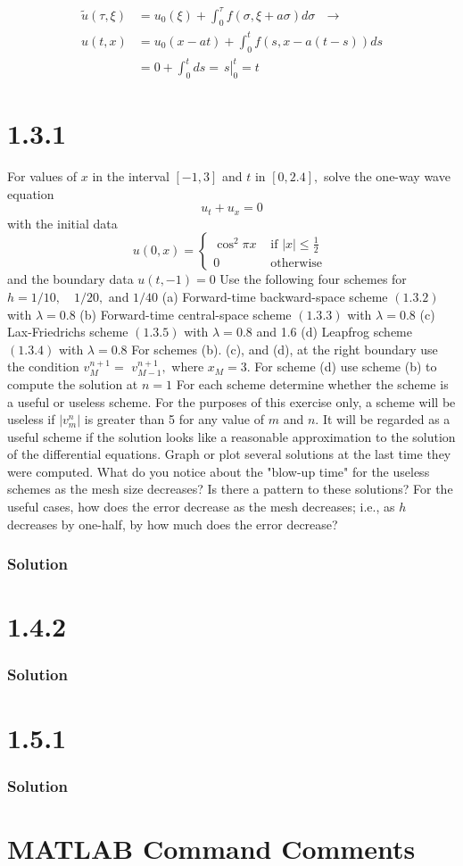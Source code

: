 \documentclass[12pt]{article}
\begin{document}
\begin{equation*}
\begin{aligned}
	\tilde{u}(\tau,\xi)& = u_0(\xi) + \int_0^\tau f(\sigma, \xi+a\sigma) d\sigma ~~~ \longrightarrow \\
	u(t,x) &= u_0(x-at) + \int_0^t f(s,x-a(t-s)) ds\\
	&= 0 + \int_0^t ds = \left.\frac{}{}s\right|_0^t = t
\end{aligned}
\end{equation*}




\section*{1.3.1}

For values of $x$ in the interval $[-1,3]$ and $t$ in $[0,2.4],$ solve the one-way wave equation
$$
u_{t}+u_{x}=0
$$
with the initial data
$$
u(0, x)=\left\{\begin{array}{ll}
{\cos ^{2} \pi x} & {\text { if }|x| \leq \frac{1}{2}} \\
{0} & {\text { otherwise }}
\end{array}\right.
$$
and the boundary data $u(t,-1)=0$
Use the following four schemes for $h=1 / 10, \quad 1 / 20,$ and $1 / 40$
(a) Forward-time backward-space scheme $(1.3 .2)$ with $\lambda=0.8$
(b) Forward-time central-space scheme $(1.3 .3)$ with $\lambda=0.8$
(c) Lax-Friedrichs scheme $(1.3 .5)$ with $\lambda=0.8$ and 1.6
(d) Leapfrog scheme $(1.3 .4)$ with $\lambda=0.8$
For schemes (b). (c), and (d), at the right boundary use the condition $v_{M}^{n+1}=$ $v_{M-1}^{n+1},$ where $x_{M}=3 .$ For scheme (d) use scheme (b) to compute the solution at $n=1$
For each scheme determine whether the scheme is a useful or useless scheme. For the purposes of this exercise only, a scheme will be useless if $\left|v_{m}^{n}\right|$ is greater than
5 for any value of $m$ and $n .$ It will be regarded as a useful scheme if the solution looks like a reasonable approximation to the solution of the differential equations. Graph or plot several solutions at the last time they were computed. What do you notice about the "blow-up time" for the useless schemes as the mesh size decreases? Is there a pattern to these solutions? For the useful cases, how does the error decrease
as the mesh decreases; i.e., as $h$ decreases by one-half, by how much does the error decrease?
\subsubsection*{Solution}

\section*{1.4.2}
\subsubsection*{Solution}

\section*{1.5.1}
\subsubsection*{Solution}

\section*{MATLAB Command Comments}
\end{document}
